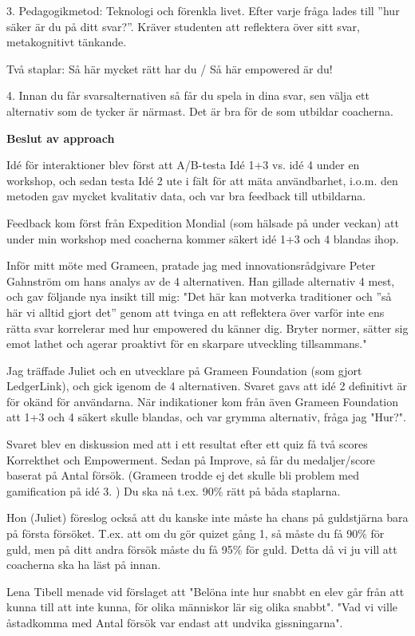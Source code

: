 3. Pedagogikmetod: Teknologi och förenkla livet. Efter varje fråga lades till ”hur säker är du på ditt svar?”. Kräver studenten att reflektera över sitt svar, metakognitivt tänkande.

Två staplar:
Så här mycket rätt har du / Så här empowered är du!

4. Innan du får svarsalternativen så får du spela in dina svar, sen välja ett alternativ som de tycker är närmast. Det är bra för de som utbildar coacherna.

\textbf{Beslut av approach}

Idé för interaktioner blev först att A/B-testa Idé 1+3 vs. idé 4 under en workshop, och sedan testa Idé 2 ute i fält för att mäta användbarhet, i.o.m. den metoden gav mycket kvalitativ data, och var bra feedback till utbildarna. 

Feedback kom först från Expedition Mondial (som hälsade på under veckan) att under min workshop med coacherna kommer säkert idé 1+3 och 4 blandas ihop.

Inför mitt möte med Grameen, pratade jag med innovationsrådgivare Peter Gahnström om hans analys av de 4 alternativen. Han gillade alternativ 4 mest, och gav följande nya insikt till mig: "Det här kan motverka traditioner och ”så här vi alltid gjort det” genom att tvinga en att reflektera över varför inte ens rätta svar korrelerar med hur empowered du känner dig. Bryter normer, sätter sig emot lathet och agerar proaktivt för en skarpare utveckling tillsammans."

Jag träffade Juliet och en utvecklare på Grameen Foundation (som gjort LedgerLink), och gick igenom de 4 alternativen. Svaret gavs att idé 2 definitivt är för okänd för användarna. När indikationer kom från även Grameen Foundation att 1+3 och 4 säkert skulle blandas, och var grymma alternativ, fråga jag "Hur?".

Svaret blev en diskussion med att i ett resultat efter ett quiz få två scores Korrekthet och Empowerment. Sedan på Improve, så får du medaljer/score baserat på Antal försök. (Grameen trodde ej det skulle bli problem med gamification på idé 3. ) Du ska nå t.ex. 90\% rätt på båda staplarna.

Hon (Juliet) föreslog också att du kanske inte måste ha chans på guldstjärna bara på första försöket. T.ex. att om du gör quizet gång 1, så måste du få 90\% för guld, men på ditt andra försök måste du få 95\% för guld. Detta då vi ju vill att coacherna ska ha läst på innan.

Lena Tibell menade vid förslaget att "Belöna inte hur snabbt en elev går från att kunna till att inte kunna, för olika människor lär sig olika snabbt". "Vad vi ville åstadkomma med Antal försök var endast att undvika gissningarna".

